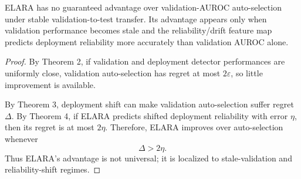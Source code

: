 \begin{corollary}
\label{cor:boundary}
ELARA has no guaranteed advantage over validation-AUROC auto-selection under stable validation-to-test transfer. Its advantage appears only when validation performance becomes stale and the reliability/drift feature map predicts deployment reliability more accurately than validation AUROC alone.
\end{corollary}
\begin{proof}
By Theorem 2, if validation and deployment detector performances are uniformly close, validation auto-selection has regret at most $2\varepsilon$, so little improvement is available.

By Theorem 3, deployment shift can make validation auto-selection suffer regret $\Delta$. By Theorem 4, if ELARA predicts shifted deployment reliability with error $\eta$, then its regret is at most $2\eta$. Therefore, ELARA improves over auto-selection whenever
\[
\Delta > 2\eta.
\]
Thus ELARA's advantage is not universal; it is localized to stale-validation and reliability-shift regimes.
\end{proof}
